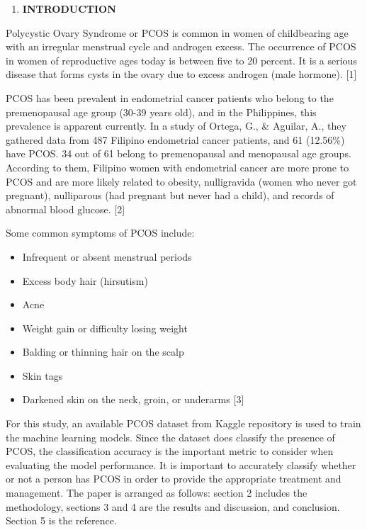 \documentclass[
]{article}
\author{}
\date{}
\begin{document}
\begin{enumerate}
\def\labelenumi{\Roman{enumi}.}
\item
  \textbf{INTRODUCTION}
\end{enumerate}

Polycystic Ovary Syndrome or PCOS is common in women of childbearing age
with an irregular menstrual cycle and androgen excess. The occurrence of
PCOS in women of reproductive ages today is between five to 20 percent.
It is a serious disease that forms cysts in the ovary due to excess
androgen (male hormone). {[}1{]}

PCOS has been prevalent in endometrial cancer patients who belong to the
premenopausal age group (30-39 years old), and in the Philippines, this
prevalence is apparent currently. In a study of Ortega, G., \& Aguilar,
A., they gathered data from 487 Filipino endometrial cancer patients,
and 61 (12.56\%) have PCOS. 34 out of 61 belong to premenopausal and
menopausal age groups. According to them, Filipino women with
endometrial cancer are more prone to PCOS and are more likely related to
obesity, nulligravida (women who never got pregnant), nulliparous (had
pregnant but never had a child), and records of abnormal blood glucose.
{[}2{]}

Some common symptoms of PCOS include:

\begin{itemize}
\item
  Infrequent or absent menstrual periods
\item
  Excess body hair (hirsutism)
\item
  Acne
\item
  Weight gain or difficulty losing weight
\item
  Balding or thinning hair on the scalp
\item
  Skin tags
\item
  Darkened skin on the neck, groin, or underarms {[}3{]}
\end{itemize}

For this study, an available PCOS dataset from Kaggle repository is used
to train the machine learning models. Since the dataset does classify
the presence of PCOS, the classification accuracy is the important
metric to consider when evaluating the model performance. It is
important to accurately classify whether or not a person has PCOS in
order to provide the appropriate treatment and management. The paper is
arranged as follows: section 2 includes the methodology, sections 3 and
4 are the results and discussion, and conclusion. Section 5 is the
reference.
\end{document}
